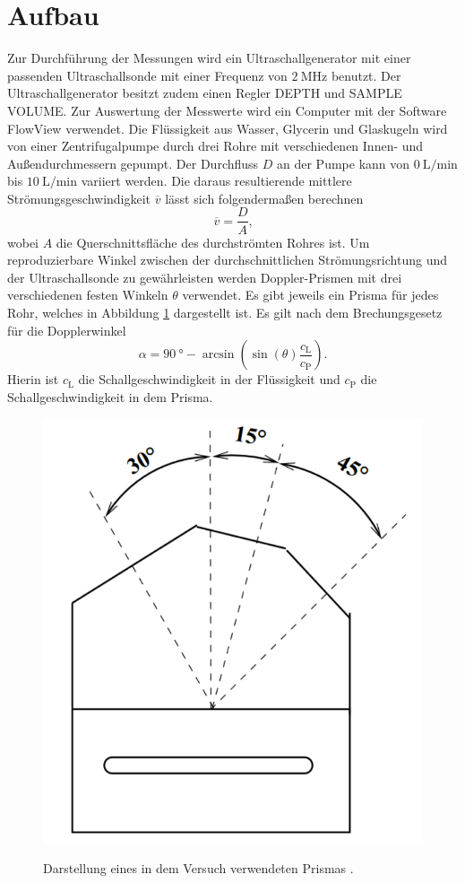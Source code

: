 \section{Aufbau}
\label{sec:Aufbau}
Zur Durchführung der Messungen wird ein Ultraschallgenerator mit einer passenden Ultraschallsonde mit einer Frequenz von $\SI{2}{\mega\hertz}$ benutzt. Der Ultraschallgenerator besitzt zudem einen Regler DEPTH und SAMPLE VOLUME. Zur Auswertung der Messwerte wird ein Computer mit der Software FlowView verwendet. Die Flüssigkeit aus Wasser, Glycerin und Glaskugeln wird von einer Zentrifugalpumpe durch drei Rohre mit verschiedenen Innen- und Außendurchmessern gepumpt. Der Durchfluss $D$ an der Pumpe kann von $\SI{0}{\liter\per\minute}$ bis $\SI{10}{\liter\per\minute}$ variiert werden. Die daraus resultierende mittlere Strömungsgeschwindigkeit $\overline{v}$ lässt sich folgendermaßen berechnen
\begin{equation}
\overline{v}=\frac{D}{A}\text{,}\label{eq:vmittel}
\end{equation}
wobei $A$ die Querschnittsfläche des durchströmten Rohres ist. Um reproduzierbare Winkel zwischen der durchschnittlichen Strömungsrichtung und der Ultraschallsonde zu gewährleisten werden Doppler-Prismen mit drei verschiedenen festen Winkeln $\theta$ verwendet. Es gibt jeweils ein Prisma für jedes Rohr, welches in Abbildung \ref{fig:prisma} dargestellt ist. Es gilt nach dem Brechungsgesetz für die Dopplerwinkel 
\begin{equation}
	\alpha = \SI{90}{\degree} - \arcsin\left(\sin(\theta) \frac{c_\text{L}}{c_\text{P}}\right)\text{.}\label{eq:dopplerwinkel}
\end{equation}
Hierin ist $c_\text{L}$ die Schallgeschwindigkeit in der Flüssigkeit und $c_\text{P}$ die Schallgeschwindigkeit in dem Prisma.
\begin{figure}
	\centering
	\caption{Darstellung eines in dem Versuch verwendeten Prismas \cite{US3}.}
	\includegraphics[width=\linewidth-70pt,height=0.3\textheight,keepaspectratio]{content/images/prisma.png}
	\label{fig:prisma}
\end{figure}